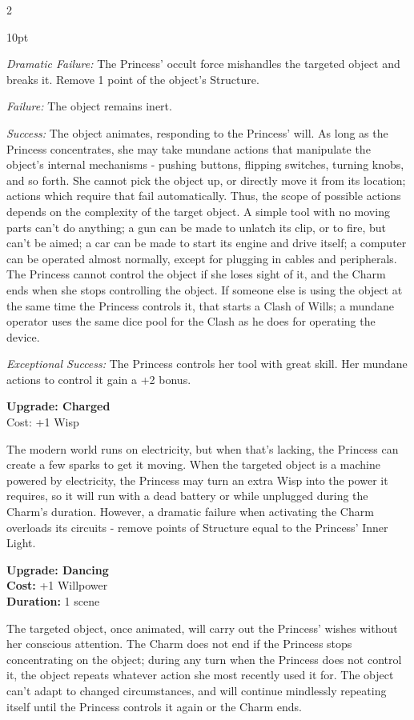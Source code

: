 \begin{multicols}{2}
\begin{myindentpar}{10pt}

\emph{Dramatic  Failure:}  The  Princess’  occult  force  mishandles  the  targeted  object  and
breaks it. Remove 1 point of the object’s Structure.

\emph{Failure:} The object remains inert.

\emph{Success:} The object animates, responding to the Princess’ will. As long as the Princess concentrates, she may take mundane actions that manipulate the object’s internal mechanisms - pushing buttons, flipping switches, turning knobs, and so forth. She cannot pick the object up, or directly move it from its location; actions which require that fail automatically. Thus, the scope of possible actions depends on the complexity of the target object. A simple tool with no moving parts can’t do anything; a gun can be made to unlatch its clip, or to fire, but can’t be aimed; a car can be made to start its engine and drive itself; a computer can be operated almost normally, except for plugging in cables and peripherals. The Princess cannot control the object if she loses sight of it, and the Charm ends when she stops controlling the object. If someone else is using the object at the same time the Princess controls it, that starts a Clash of Wills; a mundane operator uses the same dice pool for the Clash as he 
does for operating the device.

\emph{Exceptional Success:} The Princess controls her tool with great skill. Her mundane actions to control it gain a +2 bonus.

\textbf{Upgrade: Charged}\\
Cost: +1 Wisp

The modern world runs on electricity, but when that’s lacking, the Princess can create a few sparks to get it moving. When the targeted object is a machine powered by electricity, the Princess may turn an extra Wisp into the power it requires, so it will run with a dead battery or while unplugged during the Charm’s duration. However, a dramatic failure when activating the Charm overloads its circuits - remove points of Structure equal to the Princess’ Inner Light.

\textbf{Upgrade: Dancing}\\

\noindent \textbf{Cost:} +1 Willpower\\

\noindent \textbf{Duration:} 1 scene

The targeted object, once animated, will carry out the Princess’ wishes without her conscious attention. The Charm does not end if the Princess stops concentrating on the object; during any turn when the Princess does not control it, the object repeats whatever action she most recently used it for. The object can’t adapt to changed circumstances, and will continue mindlessly repeating itself until the Princess controls it again or the Charm ends.


\end{myindentpar}
\end{multicols}
